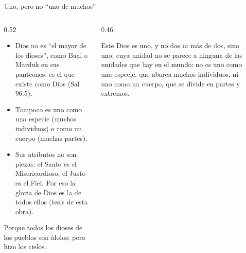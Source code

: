 \begin{frame}{Uno, pero no ``uno de muchos''}
\begin{columns}[t,onlytextwidth]
\begin{column}{0.52\textwidth}\small
\begin{itemize}
\item Dios no es ``el mayor de los dioses'', como Baal o Marduk en sus panteones: es el  que existe como Dios (Sal 96:5).
\item Tampoco es uno como una especie (muchos individuos) o como un cuerpo (muchas partes).
\item Sus atributos no son piezas: el Santo es el Misericordioso, el Justo es el Fiel. Por eso la gloria de Dios es la  de todos ellos (tesis de esta obra).
\end{itemize}
\begin{cita}[fontupper=\scriptsize\itshape]Porque todos los dioses de los pueblos son ídolos; pero \SENOR{} hizo los cielos.\end{cita}
\end{column}
\begin{column}{0.46\textwidth}
\begin{cita}[colback=dorado!10!papiro,colframe=dorado!80!azul,fontupper=\scriptsize\itshape]Este Dios es uno, y no dos ni más de dos, sino uno; cuya unidad no se parece a ninguna de las unidades que hay en el mundo: no es uno como una especie, que abarca muchos individuos, ni uno como un cuerpo, que se divide en partes y extremos.\end{cita}
\end{column}
\end{columns}
\end{frame}

